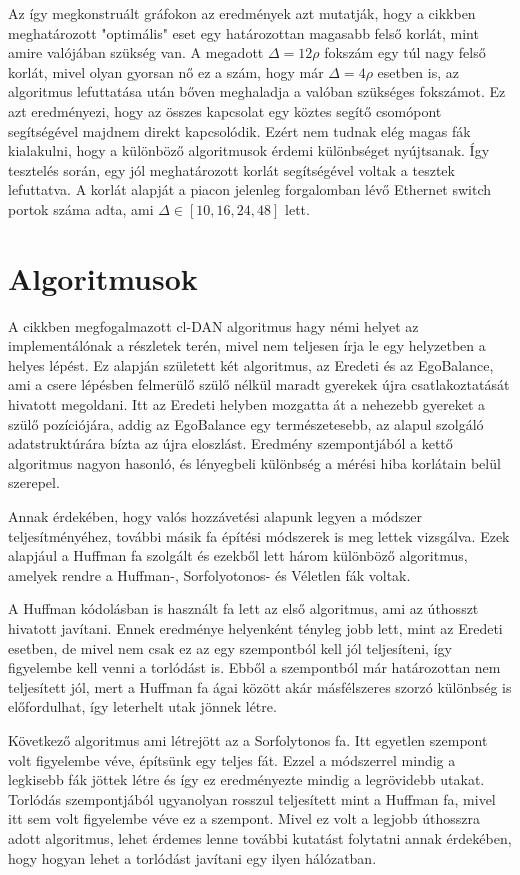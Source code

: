 \documentclass[12pt]{report}
\begin{document}
Az így megkonstruált gráfokon az eredmények azt mutatják, hogy a cikkben meghatározott "optimális" eset egy határozottan magasabb felső korlát, mint amire valójában szükség van.
A megadott $\Delta = 12\rho$ fokszám egy túl nagy felső korlát, mivel olyan gyorsan nő ez a szám, hogy már $\Delta = 4\rho$ esetben is, az algoritmus lefuttatása után bőven meghaladja a valóban szükséges fokszámot.
Ez azt eredményezi, hogy az összes kapcsolat egy köztes segítő csomópont segítségével majdnem direkt kapcsolódik.
Ezért nem tudnak elég magas fák kialakulni, hogy a különböző algoritmusok érdemi különbséget nyújtsanak.
Így tesztelés során, egy jól meghatározott korlát segítségével voltak a tesztek lefuttatva. 
A korlát alapját a piacon jelenleg forgalomban lévő Ethernet switch portok száma adta, ami $\Delta \in [10, 16, 24, 48]$ lett.

\section{Algoritmusok}

A cikkben megfogalmazott cl-DAN algoritmus hagy némi helyet az implementálónak a részletek terén, mivel nem teljesen írja le egy helyzetben a helyes lépést.
Ez alapján született két algoritmus, az Eredeti és az EgoBalance, ami a csere lépésben felmerülő szülő nélkül maradt gyerekek újra csatlakoztatását hivatott megoldani.
Itt az Eredeti helyben mozgatta át a nehezebb gyereket a szülő pozíciójára, addig az EgoBalance egy természetesebb, az alapul szolgáló adatstruktúrára bízta az újra eloszlást.
Eredmény szempontjából a kettő algoritmus nagyon hasonló, és lényegbeli különbség a mérési hiba korlátain belül szerepel.

Annak érdekében, hogy valós hozzávetési alapunk legyen a módszer teljesítményéhez, további másik fa építési módszerek is meg lettek vizsgálva.
Ezek alapjául a Huffman fa szolgált és ezekből lett három különböző algoritmus, amelyek rendre a Huffman-, Sorfolyotonos- és Véletlen fák voltak.

A Huffman kódolásban is használt fa lett az első algoritmus, ami az úthosszt hivatott javítani.
Ennek eredménye helyenként tényleg jobb lett, mint az Eredeti esetben, de mivel nem csak ez az egy szempontból kell jól teljesíteni, így figyelembe kell venni a torlódást is.
Ebből a szempontból már határozottan nem teljesített jól, mert a Huffman fa ágai között akár másfélszeres szorzó különbség is előfordulhat, így leterhelt utak jönnek létre. 

Következő algoritmus ami létrejött az a Sorfolytonos fa.
Itt egyetlen szempont volt figyelembe véve, építsünk egy teljes fát.
Ezzel a módszerrel mindig a legkisebb fák jöttek létre és így ez eredményezte mindig a legrövidebb utakat.
Torlódás szempontjából ugyanolyan rosszul teljesített mint a Huffman fa, mivel itt sem volt figyelembe véve ez a szempont.
Mivel ez volt a legjobb úthosszra adott algoritmus, lehet érdemes lenne további kutatást folytatni annak érdekében, hogy hogyan lehet a torlódást javítani egy ilyen hálózatban.
\end{document}
